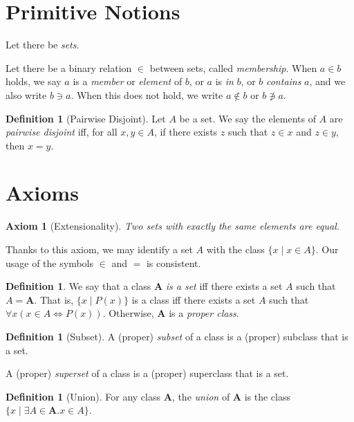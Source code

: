 \documentclass{book}
\newtheorem{ax}{Axiom}
\theoremstyle{definition}
\newtheorem{df}[prop]{Definition}
\begin{document}
\section{Primitive Notions}

Let there be \emph{sets}.

Let there be a binary relation $\in$ between sets, called \emph{membership}. When $a \in b$ holds, we say $a$ is a \emph{member} or \emph{element} of $b$, or $a$ is \emph{in} $b$, or $b$ \emph{contains} $a$, and we also write $b \ni a$. When this does not hold, we write $a \notin b$ or $b \not\ni a$.

\begin{df}[Pairwise Disjoint]
    Let $A$ be a set. We say the elements of $A$ are \emph{pairwise disjoint} iff, for all $x,y \in A$, if there exists $z$ such that $z \in x$ and $z \in y$, then $x = y$.
\end{df}

\section{Axioms}

\begin{ax}[Extensionality]
    Two sets with exactly the same elements are equal.
\end{ax}

Thanks to this axiom, we may identify a set $A$ with the class $\{ x \mid x \in A \}$. Our usage of the symbols $\in$ and $=$ is consistent.

\begin{df}
    We say that a class $\mathbf{A}$ \emph{is a set} iff there exists a set $A$ such that $A = \mathbf{A}$. That is, $\{ x \mid P(x) \}$ is a class iff there exists a set $A$ such that $\forall x (x \in A \Leftrightarrow P(x))$. Otherwise, $\mathbf{A}$ is a \emph{proper class}.
\end{df}

\begin{df}[Subset]
    A (proper) \emph{subset} of a class is a (proper) subclass that is a set.

    A (proper) \emph{superset} of a class is a (proper) superclass that is a set.
\end{df}

\begin{df}[Union]
    For any class $\mathbf{A}$, the \emph{union} of $\mathbf{A}$ is the class $\{ x \mid \exists A \in \mathbf{A}. x \in A \}$.
\end{df}
\end{document}
